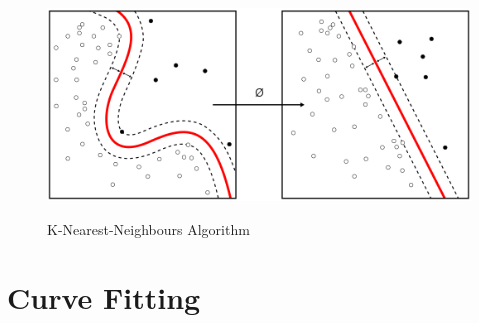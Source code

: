 \begin{figure}[H]
 \centering
  \includegraphics[width=1\textwidth]{./Bilder/k-nearest-neighbours.png}\label{Procedures_of_IPM}
  \caption{K-Nearest-Neighbours Algorithm\cite{k_nearest_neighbours_wikipedia}}
\end{figure}

%
\section{Curve Fitting}\label{sec:Curve Fitting}
%

%




